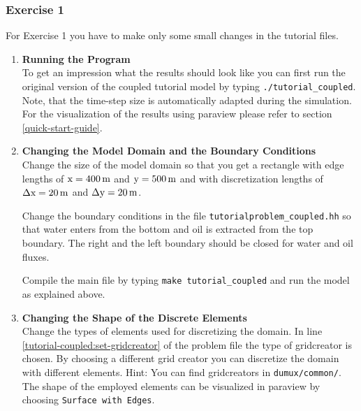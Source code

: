 \subsubsection{Exercise 1}
\renewcommand{\labelenumi}{\alph{enumi})} For Exercise 1 you have
to make only some small changes in the tutorial files.  

\begin{enumerate}

\item \textbf{Running the Program} \\
  To get an impression what the results should look like you can first run the original version of the coupled tutorial model by typing  \texttt{./tutorial\_coupled}. Note, that the time-step size is automatically adapted during the simulation. For the visualization of the results using paraview please refer to section \ref{quick-start-guide}.

\item \textbf{Changing the Model Domain and the Boundary Conditions} \\
  Change the size of the model domain so that you get a rectangle with
  edge lengths of $\text{x} = \unit[400]{m}$ and $\text{y} = \unit[500]{m}$ and with
  discretization lengths of $\Delta \text{x} = \unit[20]{m}$ and $\Delta
  \text{y} = \unit[20]{m}$.
  
  Change the boundary conditions in the file
  \texttt{tutorialproblem\_coupled.hh} so that water enters from the
  bottom and oil is extracted from the top boundary. The right and the
  left boundary should be closed for water and oil fluxes. 

  Compile the main file by typing \texttt{make tutorial\_coupled} and
  run the model as explained above.

  \item \textbf{Changing  the Shape of the Discrete Elements} \\
  Change the types of elements used for discretizing the domain. In line \ref{tutorial-coupled:set-gridcreator} of the problem file  the type of gridcreator is chosen. By choosing a different grid creator you can discretize the domain with different elements. Hint: You can find gridcreators in \texttt{dumux/common/}. The shape of the employed elements can be visualized in paraview by choosing \texttt{Surface with Edges}. 


\end{enumerate}
